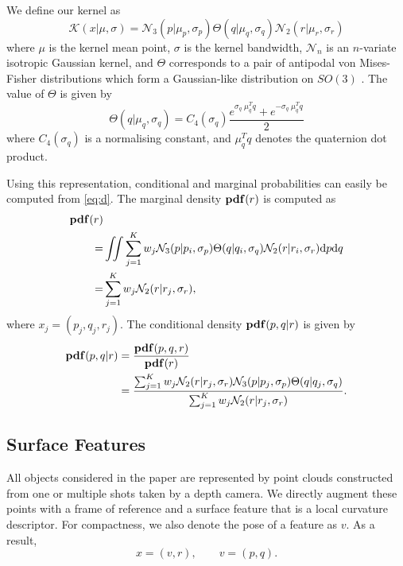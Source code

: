 We define our kernel as
\begin{equation}\label{eq:kernel_in_se3}
\mathcal{K}(x| \mu, \sigma) = \mathcal{N}_3(p| \mu_p, \sigma_p) \Theta(q| \mu_q, \sigma_q) \mathcal{N}_2(r| \mu_r, \sigma_r)
\end{equation}
where $\mu$ is the kernel mean point, $\sigma$ is the kernel bandwidth, $\mathcal{N}_n$ is an $n$-variate isotropic Gaussian kernel, and ${\Theta}$ corresponds to a pair of antipodal von Mises-Fisher distributions which form a Gaussian-like distribution on $SO(3)$ \cite{fisher1953a,sudderth2006a}. The value of ${\Theta}$ is given by
\begin{equation}
\Theta(q|\mu_q, \sigma_q) = C_4(\sigma_q) \frac {e^{\sigma_q \; \mu_q^T q} + e^{-\sigma_q \; \mu_q^T q}}2
\end{equation}
where $C_4(\sigma_q)$ is a normalising constant, and $\mu_q^T q$ denotes the quaternion dot product.

Using this representation, conditional and marginal probabilities can easily be computed from \eq\eqref{eq:d}. The marginal density $\mathbf{pdf}(r)$ is computed as
\begin{align}\label{eq:marginal}
\mathbf{pdf}(r) & \\
      = & \iint \sum_{j=1}^K w_j \mathcal{N}_3(p| p_i, \sigma_p) \Theta(q| q_i, \sigma_q) \mathcal{N}_2(r| r_i, \sigma_r) \textnormal{d}p\textnormal{d}q \\
      = &  \sum_{j=1}^K w_j \mathcal{N}_2(r| r_j, \sigma_r),
\end{align}
where $x_j = (p_j, q_j, r_j)$.
The  conditional density $\mathbf{pdf}(p,q|r)$ is given by
\begin{align}\label{eq:conditional}
\mathbf{pdf}(p,q|{r}) & = \frac{\mathbf{pdf}(p, q, {r})}{\mathbf{pdf}({r})} \\
                   & = \frac{\sum_{j=1}^K w_j \mathcal{N}_2({r}| r_j, \sigma_r) \mathcal{N}_3(p| p_j, \sigma_p) \Theta(q|q_j, \sigma_q)}{\sum_{j=1}^K w_j \mathcal{N}_2({r}| r_j, \sigma_r)}. 
\end{align}

\subsection{Surface Features}
\label{sec:surface_features}

All objects considered in the paper are represented by point clouds constructed from one or multiple shots taken by a depth camera. We directly augment these points with a frame of reference and a surface feature that is a local curvature descriptor. For compactness, we also denote the pose of a feature as $v$. As a result,
\begin{equation}
x = (v, r), \qquad v = (p, q).
\label{eq:surface.feature}
\end{equation}

